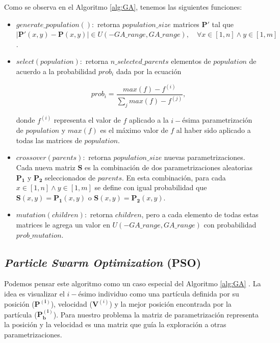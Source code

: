 Como se observa en el Algoritmo \autoref{alg:GA}, tenemos las siguientes funciones:

\begin{itemize}
    \item $generate\_population():$ 
      retorna $population\_size$ matrices 
      $\boldsymbol{P'}$ tal que 
      $|\boldsymbol{P'}(x, y) - \boldsymbol{P}(x, y)| \in U(-GA\_range, GA\_range), \quad \forall x \in [1, n]
      \land y \in [1, m]$.

    \item $select(population):$ 
      retorna $n\_selected\_parents$ elementos de $population$ de
      acuerdo a la probabilidad $prob_i$ dada por la ecuación
    
    \begin{equation}
      prob_i = \frac{max(f) - f^{(i)}}{\displaystyle\sum_{j} max(f) - f^{(j)}},
    \label{eq:prob}
    \end{equation}
    
    donde $f^{(i)}$ representa el valor de $f$ aplicado a la 
    $i-$ésima parametrización de $population$ y $max(f)$ es el máximo
    valor de $f$ al haber sido aplicado a todas las matrices de $population$.
    
    \item $crossover(parents):$ 
    retorna $population\_size$ nuevas parametrizaciones.
    Cada nueva matriz $\boldsymbol{S}$ es la combinación de dos parametrizaciones aleatorias 
    $\boldsymbol{P_1}$ y $\boldsymbol{P_2}$ seleccionados de $parents$.
    En esta combinación, para cada $x \in [1, n] \land y \in [1, m]$ se define 
    con igual probabilidad que
    $\boldsymbol{S}(x, y) = \boldsymbol{P_1}(x, y)$ o
    $\boldsymbol{S}(x, y) = \boldsymbol{P_2}(x, y)$.

    \item $mutation(children):$ 
      retorna $children$, pero
      a cada elemento de todas estas matrices
      le agrega un valor en $U(-GA\_range, GA\_range)$ con
      probabilidad $prob\_mutation$.

\end{itemize}

\subsection{\emph{Particle Swarm Optimization} (PSO)}\label{sec:pso}

Podemos pensar este algoritmo como un caso especial del Algoritmo \ref{alg:GA}
\citep{Mykel2019}.
La idea es visualizar el $i-$ésimo individuo como una partícula definida por 
su posición ($\boldsymbol{P^{(i)}}$), velocidad ($\boldsymbol{V}^{(i)}$) y 
la mejor posición encontrada por la partícula ($\boldsymbol{P^{(i)}_b}$).
Para nuestro problema la matriz de parametrización representa la posición y
la velocidad es una matriz que guía la exploración a otras parametrizaciones.

